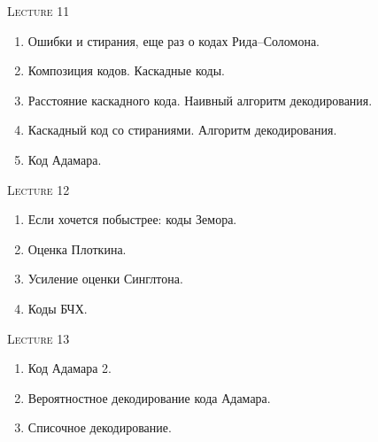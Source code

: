\centerline{\textsc{Lecture 11}}

\begin{enumerate}
    \item Ошибки и стирания, еще раз о кодах Рида--Соломона.
    \item Композиция кодов. Каскадные коды.
    \item Расстояние каскадного кода. Наивный алгоритм декодирования.
    \item Каскадный код со стираниями. Алгоритм декодирования.
    \item Код Адамара.
\end{enumerate}

\centerline{\textsc{Lecture 12}}

\begin{enumerate}
    \item Если хочется побыстрее: коды Земора.
    \item Оценка Плоткина.
    \item Усиление оценки Синглтона.
    \item Коды БЧХ.
\end{enumerate}


\centerline{\textsc{Lecture 13}}

\begin{enumerate}
    \item Код Адамара 2.
    \item Вероятностное декодирование кода Адамара.
    \item Списочное декодирование.
\end{enumerate}